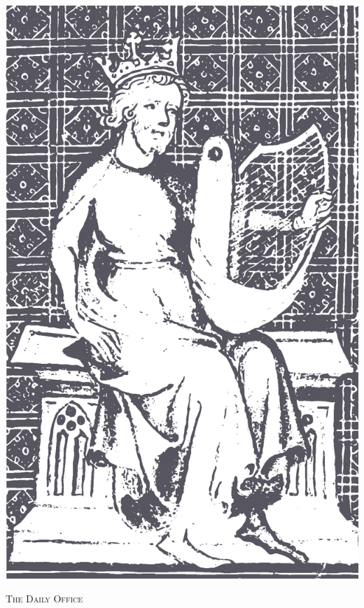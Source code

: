   \begin{center}
   \includegraphics[scale=.6]{david.eps}
   \par
   \vspace{5ex}
   	\textsc{\Huge{The Daily Office}}
   \end{center}